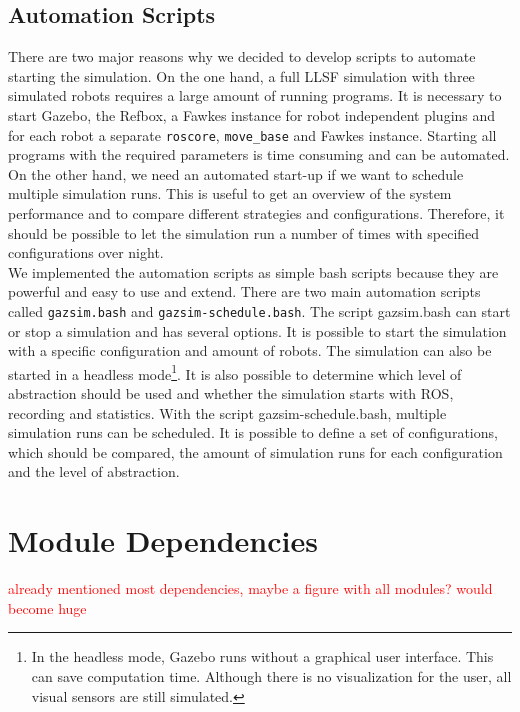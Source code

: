 \subsection{Automation Scripts}
There are two major reasons why we decided to develop scripts to automate starting the simulation. On the one hand, a full LLSF simulation with three simulated robots requires a large amount of running programs. It is necessary to start Gazebo, the Refbox, a Fawkes instance for robot independent plugins and for each robot a separate \texttt{roscore}, \texttt{move\_base} and Fawkes instance. Starting all programs with the required parameters is time consuming and can be automated. On the other hand, we need an automated start-up if we want to schedule multiple simulation runs. This is useful to get an overview of the system performance and to compare different strategies and configurations. Therefore, it should be possible to let the simulation run a number of times with specified configurations over night.\\
We implemented the automation scripts as simple bash scripts because they are powerful and easy to use and extend. There are two main automation scripts called \texttt{gazsim.bash} and \texttt{gazsim-schedule.bash}. The script gazsim.bash can start or stop a simulation and has several options. It is possible to start the simulation with a specific configuration and amount of robots. The simulation can also be started in a headless mode\footnote{In the headless mode, Gazebo runs without a graphical user interface. This can save computation time. Although there is no visualization for the user, all visual sensors are still simulated.}. It is also possible to determine which level of abstraction should be used and whether the simulation starts with ROS, recording and statistics. With the script gazsim-schedule.bash, multiple simulation runs can be scheduled. It is possible to define a set of configurations, which should be compared, the amount of simulation runs for each configuration and the level of abstraction.

\section{Module Dependencies}
\label{sec:module_dependencies}
\textcolor{red}{already mentioned most dependencies, maybe a figure with all modules? would become huge}


